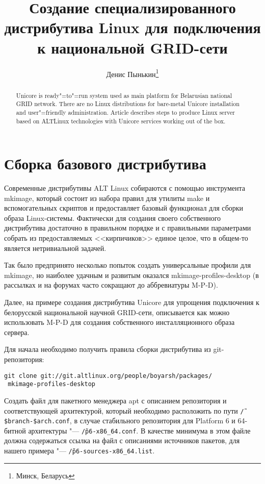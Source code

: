 \documentclass[10pt, a5paper]{article}
\begin{document}
\title{Создание специализированного дистрибутива Linux для подключения к национальной GRID-сети}
\author{Денис Пынькин\footnote{Минск, Беларусь}}
\def\progref!#1!{\texttt{#1}}

\maketitle

\begin{abstract}
Unicore is ready"=to"=run system used as main platform for Belarusian national GRID network. 
There are no Linux distributions for bare-metal Unicore installation and user"=friendly administration. 
Article describes steps to produce Linux server based on ALTLinux technologies with Unicore services working out of the box.
\end{abstract}

\section*{Сборка базового дистрибутива}
Современные дистрибутивы ALT Linux собираются с помощью инструмента mkimage,
который состоит из набора правил для утилиты make и вспомогательных скриптов 
и предоставляет базовый функционал для сборки образа Linux-системы. 
Фактически для создания своего собственного дистрибутива достаточно в 
правильном порядке и с правильными параметрами собрать из предоставляемых 
<<кирпичиков>> единое целое, что в общем-то является нетривиальной задачей.

Так было предпринято несколько попыток создать универсальные профили для mkimage,
но наиболее удачным и развитым оказался mkimage-profiles-desktop 
(в рассылках и на форумах часто сокращают до аббревиатуры M-P-D).

Далее, на примере создания дистрибутива Unicore для упрощения подключения к 
белорусской национальной научной GRID-сети, описывается как можно 
использовать M-P-D для создания собственного инсталляционного образа сервера.

Для начала необходимо получить правила сборки дистрибутива из git-репозитория:
\begin{verbatim}
git clone git://git.altlinux.org/people/boyarsh/packages/
 mkimage-profiles-desktop
\end{verbatim}

 Создать файл для пакетного менеджера apt с описанием репозитория и соответствующей 
 архитектурой, который необходимо расположить по пути {\tt \~/\$branch-\$arch.conf}, 
 в случае стабильного репозитория для Platform 6 и 64-битной архитектуры "--- \linebreak 
 {\tt \~/p6-x86\_64.conf}. В качестве минимума в этом файле должна содержаться 
 ссылка на файл с описаниями источников пакетов, для нашего примера "---
 {\tt \~/p6-sources-x86\_64.list}.
\end{document}
